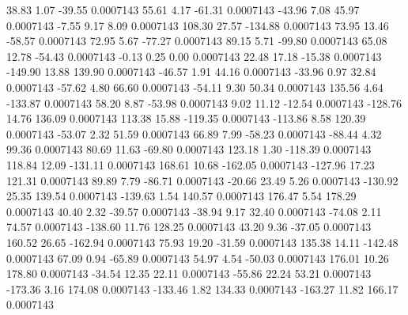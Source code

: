        38.83        1.07      -39.55     0.0007143
       55.61        4.17      -61.31     0.0007143
      -43.96        7.08       45.97     0.0007143
       -7.55        9.17        8.09     0.0007143
      108.30       27.57     -134.88     0.0007143
       73.95       13.46      -58.57     0.0007143
       72.95        5.67      -77.27     0.0007143
       89.15        5.71      -99.80     0.0007143
       65.08       12.78      -54.43     0.0007143
       -0.13        0.25        0.00     0.0007143
       22.48       17.18      -15.38     0.0007143
     -149.90       13.88      139.90     0.0007143
      -46.57        1.91       44.16     0.0007143
      -33.96        0.97       32.84     0.0007143
      -57.62        4.80       66.60     0.0007143
      -54.11        9.30       50.34     0.0007143
      135.56        4.64     -133.87     0.0007143
       58.20        8.87      -53.98     0.0007143
        9.02       11.12      -12.54     0.0007143
     -128.76       14.76      136.09     0.0007143
      113.38       15.88     -119.35     0.0007143
     -113.86        8.58      120.39     0.0007143
      -53.07        2.32       51.59     0.0007143
       66.89        7.99      -58.23     0.0007143
      -88.44        4.32       99.36     0.0007143
       80.69       11.63      -69.80     0.0007143
      123.18        1.30     -118.39     0.0007143
      118.84       12.09     -131.11     0.0007143
      168.61       10.68     -162.05     0.0007143
     -127.96       17.23      121.31     0.0007143
       89.89        7.79      -86.71     0.0007143
      -20.66       23.49        5.26     0.0007143
     -130.92       25.35      139.54     0.0007143
     -139.63        1.54      140.57     0.0007143
      176.47        5.54      178.29     0.0007143
       40.40        2.32      -39.57     0.0007143
      -38.94        9.17       32.40     0.0007143
      -74.08        2.11       74.57     0.0007143
     -138.60       11.76      128.25     0.0007143
       43.20        9.36      -37.05     0.0007143
      160.52       26.65     -162.94     0.0007143
       75.93       19.20      -31.59     0.0007143
      135.38       14.11     -142.48     0.0007143
       67.09        0.94      -65.89     0.0007143
       54.97        4.54      -50.03     0.0007143
      176.01       10.26      178.80     0.0007143
      -34.54       12.35       22.11     0.0007143
      -55.86       22.24       53.21     0.0007143
     -173.36        3.16      174.08     0.0007143
     -133.46        1.82      134.33     0.0007143
     -163.27       11.82      166.17     0.0007143
